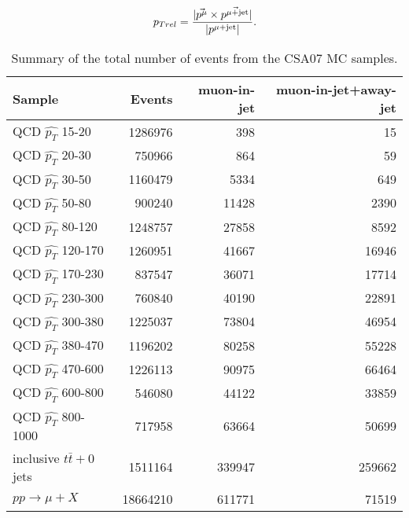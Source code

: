 \begin{equation}
p_{Trel}=\frac{|\vec{p^{\mu}} \times \vec{p^{\mu + {\rm jet}}}|}{|p^{\mu + {\rm jet}}|}.
\end{equation}

\begin{table}[bth]
 \begin{center}
 \begin{tabular}{l|r|r|r}
Sample                 & Events  & muon-in-jet & muon-in-jet+away-jet \\ \hline
QCD $\hat{p_T}$ 15-20  & 1286976 &    398      &       15 \\
QCD $\hat{p_T}$ 20-30  & 750966  &   864       &      59 \\
QCD $\hat{p_T}$ 30-50  & 1160479 &   5334      &      649 \\
QCD $\hat{p_T}$ 50-80  & 900240  & 11428       &    2390 \\
QCD $\hat{p_T}$ 80-120  & 1248757 &  27858     &      8592 \\
QCD $\hat{p_T}$ 120-170  & 1260951&   41667    &      16946 \\
QCD $\hat{p_T}$ 170-230  & 837547 &  36071     &     17714 \\
QCD $\hat{p_T}$ 230-300  & 760840 &  40190     &     22891 \\
QCD $\hat{p_T}$ 300-380  & 1225037&   73804    &      46954 \\
QCD $\hat{p_T}$ 380-470  & 1196202&   80258    &      55228 \\
QCD $\hat{p_T}$ 470-600  & 1226113&   90975    &      66464 \\
QCD $\hat{p_T}$ 600-800  & 546080 &  44122     &     33859 \\
QCD $\hat{p_T}$ 800-1000  & 717958  &   63664  &        50699 \\ \hline
inclusive $t\bar{t}+0$jets& 1511164 &    339947 &       259662 \\ \hline
$pp\rightarrow \mu +X$    & 18664210 &    611771 &      71519 \\ \hline

 \end{tabular}
 \end{center}
\caption[]{Summary of the total number of events from the CSA07 MC samples.}
\label{tab:samples}
\end{table}

